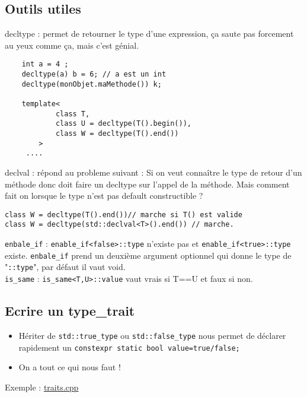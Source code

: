 \documentclass{beamer}
\begin{document}
\subsection{Outils utiles}

\begin{frame}[containsverbatim]
decltype : permet de retourner le type d'une expression, ça saute pas forcement au yeux comme ça, mais c'est génial.

\begin{lstlisting}
	int a = 4 ;
	decltype(a) b = 6; // a est un int
	decltype(monObjet.maMethode()) k; 

	template<
            class T,
            class U = decltype(T().begin()),
            class W = decltype(T().end())
        >
     .... 
\end{lstlisting}
\end{frame}

\begin{frame}[containsverbatim]
declval : répond au probleme suivant : Si on veut connaître le type de retour d'un méthode donc doit faire un decltype sur l'appel de la méthode. Mais comment fait on lorsque le type n'est pas default constructible ? 
	\begin{lstlisting}
class W = decltype(T().end())// marche si T() est valide
class W = decltype(std::declval<T>().end()) // marche.
	\end{lstlisting}
	
\lstinline{enbale_if} : \lstinline{enable_if<false>::type} n'existe pas et \lstinline{enable_if<true>::type} existe. \lstinline{enbale_if} prend un deuxième argument optionnel qui donne le type de "\lstinline{::type}", par défaut il vaut void.
\\ 
\lstinline{is_same} : \lstinline{is_same<T,U>::value} vaut vrais si T==U et faux si non.

\end{frame}

\subsection{Ecrire un type\_trait}
\begin{frame}[containsverbatim]
\begin{itemize}
	\item Hériter de \lstinline{std::true_type} ou \lstinline{std::false_type} nous permet de déclarer rapidement un \lstinline{constexpr static bool value=true/false;}
	\item On a tout ce qui nous faut !
\end{itemize}


Exemple : \href{run:../code_demo/traits.cpp}{traits.cpp}\\

\end{frame}
\end{document}
